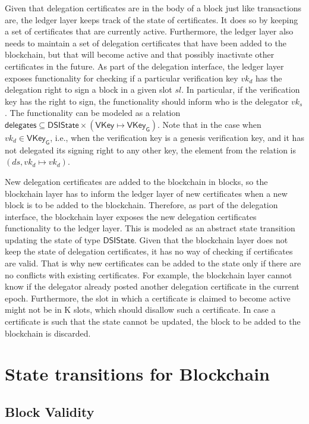 \documentclass[11pt,a4paper]{article}
\newcommand{\fun}[1]{\mathsf{#1}}
\newcommand{\type}[1]{\mathsf{#1}}
\newcommand{\VKey}{\type{VKey}}
\newcommand{\VKeyGen}{\type{VKey_G}}
\newcommand{\DelegState}{\type{DSIState}}
\newcommand{\delegationname}{delegates} %
\newcommand{\partialf}{\mapsto}
\begin{document}
Given that delegation certificates are in the body of a block just like
transactions are, the ledger layer keeps track of the state of certificates.
%
It does so by keeping a set of certificates that are currently active.
%
Furthermore, the ledger layer also needs to maintain a set of delegation
certificates that have been added to the blockchain, but that will become
active and that possibly inactivate other certificates in the future.
%
As part of the delegation interface, the ledger layer exposes functionality
for checking if a particular verification key $vk_d$ has the delegation right
to sign a block in a given slot $sl$.
%
In particular, if the verification key has the right to sign, the
functionality should inform who is the delegator $vk_s$.
%
The functionality can be modeled as a relation
$\fun{\delegationname} \subseteq \DelegState \times (\VKey \partialf \VKeyGen)$.
%
Note that in the case when $vk_d \in \VKeyGen$, i.e., when the verification
key is a genesis verification key, and it has not delegated its signing
right to any other key, the element from the relation is
$(ds, vk_d \partialf vk_d)$.


New delegation certificates are added to the blockchain in blocks, so the
blockchain layer has to inform the ledger layer of new certificates when a new
block is to be added to the blockchain.
%
Therefore, as part of the delegation interface, the blockchain layer exposes
the new delegation certificates functionality to the ledger layer.
%
This is modeled as an abstract state transition updating the state of type
$\DelegState$.
%
Given that the blockchain layer does not keep the state of delegation
certificates, it has no way of checking if certificates are valid.
%
That is why new certificates can be added to the state only if there are no
conflicts with existing certificates.
%
For example, the blockchain layer cannot know if the delegator already posted
another delegation certificate in the current epoch.
%
Furthermore, the slot in which a certificate is claimed to become active might
not be in K slots, which should disallow such a certificate.
%
In case a certificate is such that the state cannot be updated, the block to
be added to the blockchain is discarded.


\section{State transitions for Blockchain}
\label{sec:state-trans-chain}

\subsection{Block Validity}
\label{sec:block-valid}
\end{document}
